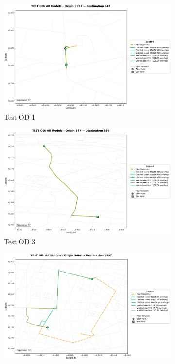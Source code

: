 \begin{figure}[H]
    \centering
    \begin{subfigure}{0.49\linewidth}
        \centering
        \includegraphics[width=\linewidth]{assets/plots/eval/porto/cross_model/test/test_od_comparison_1_origin9991_dest542.pdf}
        \caption{Test OD 1}
    \end{subfigure}
    \begin{subfigure}{0.49\linewidth}
        \centering
        \includegraphics[width=\linewidth]{assets/plots/eval/porto/cross_model/test/test_od_comparison_3_origin587_dest554.pdf}
        \caption{Test OD 3}
    \end{subfigure}
    \begin{subfigure}{0.49\linewidth}
        \centering
        \includegraphics[width=\linewidth]{assets/plots/eval/porto/cross_model/test/test_od_comparison_5_origin5462_dest1997.pdf}

\end{subfigure}
\end{figure}
